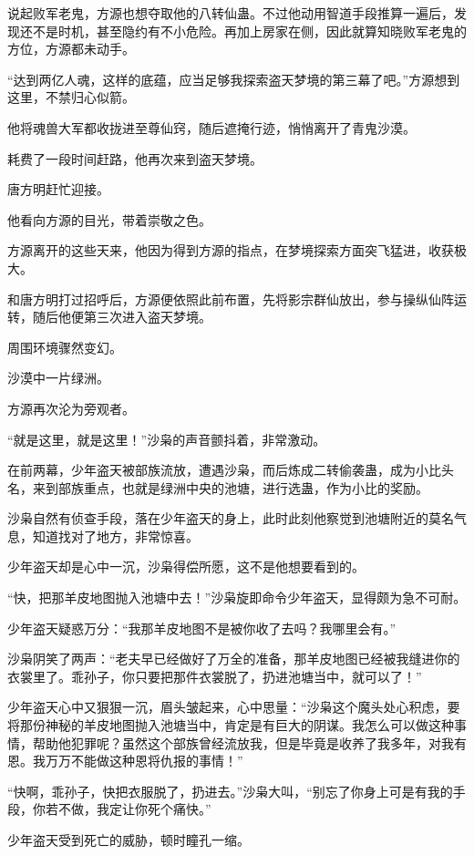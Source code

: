 \begin{this_body}
说起败军老鬼，方源也想夺取他的八转仙蛊。不过他动用智道手段推算一遍后，发现还不是时机，甚至隐约有不小危险。再加上房家在侧，因此就算知晓败军老鬼的方位，方源都未动手。

“达到两亿人魂，这样的底蕴，应当足够我探索盗天梦境的第三幕了吧。”方源想到这里，不禁归心似箭。

他将魂兽大军都收拢进至尊仙窍，随后遮掩行迹，悄悄离开了青鬼沙漠。

耗费了一段时间赶路，他再次来到盗天梦境。

唐方明赶忙迎接。

他看向方源的目光，带着崇敬之色。

方源离开的这些天来，他因为得到方源的指点，在梦境探索方面突飞猛进，收获极大。

和唐方明打过招呼后，方源便依照此前布置，先将影宗群仙放出，参与操纵仙阵运转，随后他便第三次进入盗天梦境。

周围环境骤然变幻。

沙漠中一片绿洲。

方源再次沦为旁观者。

“就是这里，就是这里！”沙枭的声音颤抖着，非常激动。

在前两幕，少年盗天被部族流放，遭遇沙枭，而后炼成二转偷袭蛊，成为小比头名，来到部族重点，也就是绿洲中央的池塘，进行选蛊，作为小比的奖励。

沙枭自然有侦查手段，落在少年盗天的身上，此时此刻他察觉到池塘附近的莫名气息，知道找对了地方，非常惊喜。

少年盗天却是心中一沉，沙枭得偿所愿，这不是他想要看到的。

“快，把那羊皮地图抛入池塘中去！”沙枭旋即命令少年盗天，显得颇为急不可耐。

少年盗天疑惑万分：“我那羊皮地图不是被你收了去吗？我哪里会有。”

沙枭阴笑了两声：“老夫早已经做好了万全的准备，那羊皮地图已经被我缝进你的衣裳里了。乖孙子，你只要把那件衣裳脱了，扔进池塘当中，就可以了！”

少年盗天心中又狠狠一沉，眉头皱起来，心中思量：“沙枭这个魔头处心积虑，要将那份神秘的羊皮地图抛入池塘当中，肯定是有巨大的阴谋。我怎么可以做这种事情，帮助他犯罪呢？虽然这个部族曾经流放我，但是毕竟是收养了我多年，对我有恩。我万万不能做这种恩将仇报的事情！”

“快啊，乖孙子，快把衣服脱了，扔进去。”沙枭大叫，“别忘了你身上可是有我的手段，你若不做，我定让你死个痛快。”

少年盗天受到死亡的威胁，顿时瞳孔一缩。


\end{this_body}
